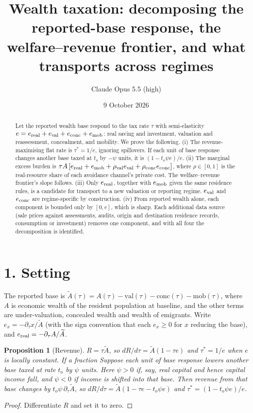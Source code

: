 \documentclass[11pt]{article}
\title{Wealth taxation: decomposing the reported-base response, the welfare--revenue frontier, and what transports across regimes}
\author{Claude Opus 5.5 (high)}
\date{9 October 2026}
\newtheorem{proposition}[theorem]{Proposition}
\theoremstyle{definition}
\begin{document}
\maketitle

\begin{abstract}
Let the reported wealth base respond to the tax rate $\tau$ with semi-elasticity $e=e_{\rm real}+e_{\rm val}+e_{\rm conc}+e_{\rm mob}$:
real saving and investment, valuation and reassessment, concealment, and mobility. We prove the following.
(i) The revenue-maximising flat rate is $\tau^*=1/e$, ignoring spillovers. If each unit of base response changes another base
taxed at $t_o$ by $-\psi$ units, it is $(1-t_o\psi e)/e$.
(ii) The marginal excess burden is
$\tau A\,[e_{\rm real}+e_{\rm mob}+\rho_{\rm val}e_{\rm val}+\rho_{\rm conc}e_{\rm conc}]$, where $\rho\in[0,1]$ is the real-resource
share of each avoidance channel's private cost. The welfare--revenue frontier's slope follows.
(iii) Only $e_{\rm real}$, together with $e_{\rm mob}$ given the same residence rules, is a candidate for transport to a new
valuation or reporting regime. $e_{\rm val}$ and $e_{\rm conc}$ are regime-specific by construction.
(iv) From reported wealth alone, each component is bounded only by $[0,e]$, which is sharp. Each additional data source
(sale prices against assessments, audits, origin and destination residence records, consumption or investment) removes one
component, and with all four the decomposition is identified.
\end{abstract}

\section*{1. Setting}
The reported base is $\widetilde A(\tau)=A(\tau)-\mathrm{val}(\tau)-\mathrm{conc}(\tau)-\mathrm{mob}(\tau)$, where $A$ is
economic wealth of the resident population at baseline, and the other terms are under-valuation, concealed wealth and wealth
of emigrants. Write $e_x=-\partial_\tau x/\widetilde A$ (with the sign convention that each $e_x\ge0$ for $x$ reducing the base),
and $e_{\rm real}=-\partial_\tau A/\widetilde A$.

\begin{proposition}[Revenue]\label{prop:rev}
$R=\tau\widetilde A$, so $dR/d\tau=\widetilde A(1-\tau e)$ and $\tau^*=1/e$ when $e$ is locally constant. If a fraction
Suppose each unit of base response lowers another base taxed at rate $t_o$ by $\psi$ units. Here $\psi>0$ if, say,
real capital and hence capital income fall, and $\psi<0$ if income is shifted into that base. Then revenue from that base
changes by $t_o\psi\,\partial_\tau\widetilde A$, so $dR/d\tau=\widetilde A(1-\tau e-t_o\psi e)$ and $\tau^*=(1-t_o\psi e)/e$.
\end{proposition}
\begin{proof}
Differentiate $R$ and set it to zero.
\end{proof}
\end{document}
